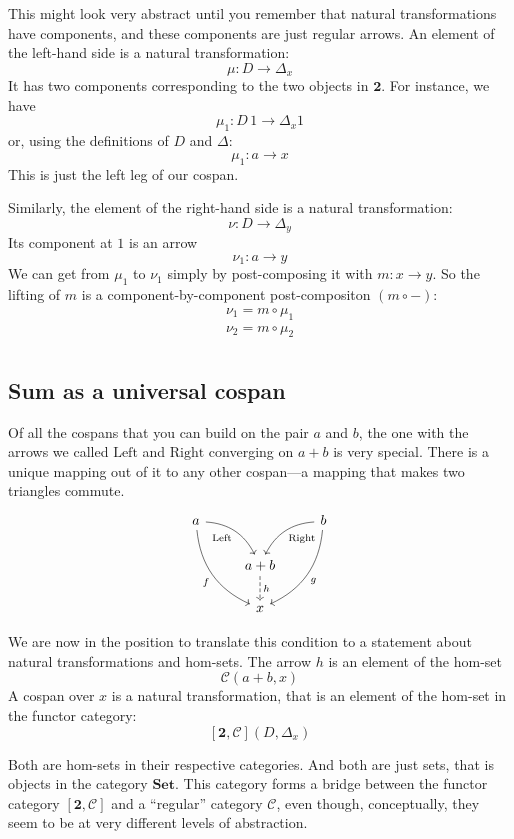 \documentclass[DaoFP]{subfiles}
\begin{document}
This might look very abstract until you remember that natural transformations have components, and these components are just regular arrows. An element of the left-hand side is a natural transformation:
\[ \mu \colon D \to \Delta_x \]
It has two components corresponding to the two objects in $\mathbf{2}$. For instance, we have
\[ \mu_1 \colon D \, 1 \to \Delta_x 1 \]
or, using the definitions of $D$ and $\Delta$:
\[ \mu_1 \colon a \to x \]
This is just the left leg of our cospan. 

Similarly, the element of the right-hand side is a natural transformation:
\[ \nu \colon D \to \Delta_{y} \]
Its component at $1$ is an arrow
\[ \nu_1 \colon a \to y \]
We can get from $\mu_1$ to $\nu_1$ simply by post-composing it with $m \colon x \to y$. So the lifting of $m$ is a component-by-component post-compositon $(m \circ -)$:
\begin{align*}
\nu_1 = m \circ \mu_1 \\
\nu_2 = m \circ \mu_2 \\
\end{align*}

\subsection{Sum as a universal cospan}

Of all the cospans that you can build on the pair $a$ and $b$, the one with the arrows we called $\text{Left}$ and $\text{Right}$ converging on $a + b$  is very special. There is a unique mapping out of it to any other cospan---a mapping that makes two triangles commute.  
\[
 \begin{tikzcd}
 a
 \arrow[dr,  bend left, "\text{Left}"']
 \arrow[ddr, bend right, "f"']
 && b
 \arrow[dl, bend right, "\text{Right}"]
 \arrow[ddl, bend left, "g"]
 \\
&a + b
\arrow[d, dashed, "h"]
\\
& x
 \end{tikzcd}
\]

We are now in the position to translate this condition to a statement about natural transformations and hom-sets. The arrow $h$ is an element of the hom-set 
\[ \mathcal{C}(a + b, x)\]
A cospan over $x$ is a natural transformation, that is an element of the hom-set in the functor category:
\[ [\mathbf{2}, \mathcal{C}](D, \Delta_x) \]

Both are hom-sets in their respective categories. And both are just sets, that is objects in the category $\mathbf{Set}$. This category forms a bridge between the functor category $[\mathbf{2}, \mathcal{C}]$ and a ``regular'' category $\mathcal{C}$, even though, conceptually, they seem to be at very different levels of abstraction. 
\end{document}
